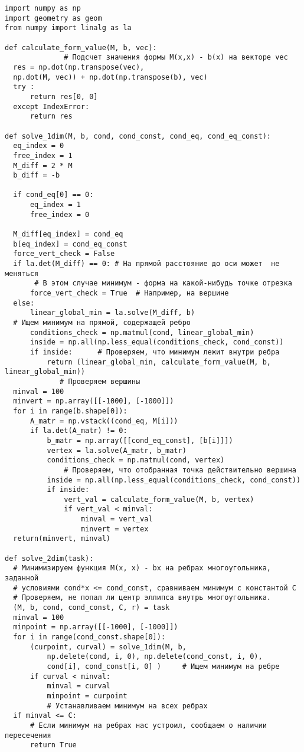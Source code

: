 \documentclass[pdftex,ptm,12pt,a4paper]{report}
\begin{document}
\begin{verbatim}
import numpy as np
import geometry as geom
from numpy import linalg as la

def calculate_form_value(M, b, vec):
              # Подсчет значения формы M(x,x) - b(x) на векторе vec
  res = np.dot(np.transpose(vec),
  np.dot(M, vec)) + np.dot(np.transpose(b), vec)
  try :
      return res[0, 0]
  except IndexError:
      return res

def solve_1dim(M, b, cond, cond_const, cond_eq, cond_eq_const):
  eq_index = 0
  free_index = 1
  M_diff = 2 * M
  b_diff = -b

  if cond_eq[0] == 0:
      eq_index = 1
      free_index = 0

  M_diff[eq_index] = cond_eq
  b[eq_index] = cond_eq_const
  force_vert_check = False
  if la.det(M_diff) == 0: # На прямой расстояние до оси может  не меняться
       # В этом случае минимум - форма на какой-нибудь точке отрезка
      force_vert_check = True  # Например, на вершине
  else:
      linear_global_min = la.solve(M_diff, b)
  # Ищем минимум на прямой, содержащей ребро
      conditions_check = np.matmul(cond, linear_global_min)
      inside = np.all(np.less_equal(conditions_check, cond_const))
      if inside:      # Проверяем, что минимум лежит внутри ребра
          return (linear_global_min, calculate_form_value(M, b, linear_global_min))
             # Проверяем вершины
  minval = 100
  minvert = np.array([[-1000], [-1000]])
  for i in range(b.shape[0]):
      A_matr = np.vstack((cond_eq, M[i]))
      if la.det(A_matr) != 0:
          b_matr = np.array([[cond_eq_const], [b[i]]])
          vertex = la.solve(A_matr, b_matr)
          conditions_check = np.matmul(cond, vertex)
              # Проверяем, что отобранная точка действительно вершина
          inside = np.all(np.less_equal(conditions_check, cond_const))
          if inside:
              vert_val = calculate_form_value(M, b, vertex)
              if vert_val < minval:
                  minval = vert_val
                  minvert = vertex
  return(minvert, minval)

def solve_2dim(task):
  # Минимизируем функция M(x, x) - bx на ребрах многоугольника, заданной
  # условиями cond*x <= cond_const, сравниваем минимум с константой C
  # Проверяем, не попал ли центр эллипса внутрь многоугольника.
  (M, b, cond, cond_const, C, r) = task
  minval = 100
  minpoint = np.array([[-1000], [-1000]])
  for i in range(cond_const.shape[0]):
      (curpoint, curval) = solve_1dim(M, b,
          np.delete(cond, i, 0), np.delete(cond_const, i, 0),
          cond[i], cond_const[i, 0] )     # Ищем минимум на ребре
      if curval < minval:
          minval = curval
          minpoint = curpoint
          # Устанавливаем минимум на всех ребрах
  if minval <= C:
      # Если минимум на ребрах нас устроил, сообщаем о наличии пересечения
      return True


\end{verbatim}
\end{document}
